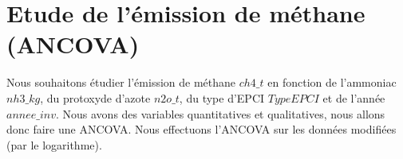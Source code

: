 \documentclass[
]{article}
\newenvironment{Shaded}{\begin{snugshade}}{\end{snugshade}}
\newcommand{\AttributeTok}[1]{\textcolor[rgb]{0.13,0.29,0.53}{#1}}
\newcommand{\CommentTok}[1]{\textcolor[rgb]{0.56,0.35,0.01}{\textit{#1}}}
\newcommand{\ConstantTok}[1]{\textcolor[rgb]{0.56,0.35,0.01}{#1}}
\newcommand{\ControlFlowTok}[1]{\textcolor[rgb]{0.13,0.29,0.53}{\textbf{#1}}}
\newcommand{\DecValTok}[1]{\textcolor[rgb]{0.00,0.00,0.81}{#1}}
\newcommand{\FunctionTok}[1]{\textcolor[rgb]{0.13,0.29,0.53}{\textbf{#1}}}
\newcommand{\NormalTok}[1]{#1}
\newcommand{\OtherTok}[1]{\textcolor[rgb]{0.56,0.35,0.01}{#1}}
\newcommand{\SpecialCharTok}[1]{\textcolor[rgb]{0.81,0.36,0.00}{\textbf{#1}}}
\newcommand{\StringTok}[1]{\textcolor[rgb]{0.31,0.60,0.02}{#1}}
\begin{document}
\begin{Shaded}
\end{Shaded}

\hypertarget{etude-de-luxe9mission-de-muxe9thane-ancova}{%
\section{Etude de l'émission de méthane
(ANCOVA)}\label{etude-de-luxe9mission-de-muxe9thane-ancova}}

Nous souhaitons étudier l'émission de méthane \(ch4\_t\) en fonction de
l'ammoniac \(nh3\_kg\), du protoxyde d'azote \(n2o\_t\), du type d'EPCI
\(TypeEPCI\) et de l'année \(annee\_inv\). Nous avons des variables
quantitatives et qualitatives, nous allons donc faire une ANCOVA. Nous
effectuons l'ANCOVA sur les données modifiées (par le logarithme).
\end{document}
